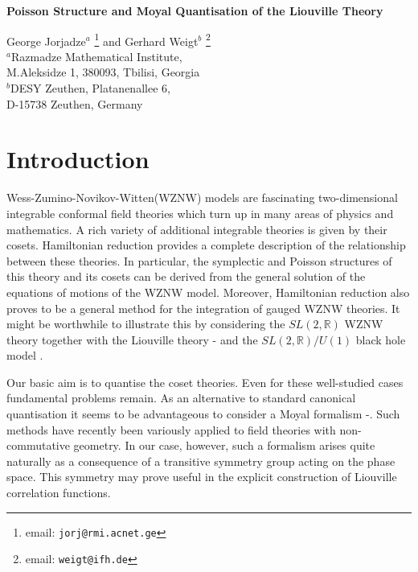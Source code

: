 \documentclass[a4paper,12pt]{article}
\renewcommand{\title}[1]{\begin{center}\bf\Large #1\end{center}}
\renewcommand{\author}[1]{\begin{center}\large #1\end{center}}
\newcommand{\rr}{\mathbb{R}}
\begin{document}
\title{Poisson Structure and Moyal Quantisation of the Liouville
 Theory }
\author{
 George Jorjadze${}^a$
\footnote{email: \tt jorj@rmi.acnet.ge}
 and Gerhard Weigt${}^b$
\footnote{email: \tt weigt@ifh.de} \\
{\small${}^a$Razmadze Mathematical Institute,}\\
  {\small M.Aleksidze 1, 380093, Tbilisi, Georgia}\\
{\small${}^b$DESY Zeuthen, Platanenallee 6,}\\
{\small D-15738 Zeuthen, Germany}}


\begin{abstract}
\noindent
The symplectic and Poisson structures of the Liouville theory are
derived from the symplectic form of the $SL(2,\rr)$ WZNW theory by
gauge invariant Hamiltonian reduction. Causal non-equal time Poisson
brackets for a Liouville field are presented.  Using the symmetries of
the Liouville theory, symbols of chiral fields are constructed and
their $*$-products calculated. Quantum deformations consistent with
the canonical quantisation result, and a non-equal time commutator
is given.
\end{abstract}

\baselineskip=20pt

\vspace{0.3cm}

\setcounter{equation}{0}
\section{Introduction}

\noindent
Wess-Zumino-Novikov-Witten(WZNW) models \cite{WZNW} are fascinating
two-dimensional integrable conformal field theories which turn
up in many areas of physics and mathematics. A rich variety of additional
integrable theories is given by their cosets.  Hamiltonian
reduction \cite{Balog, FJW} provides a complete description of the
relationship between these theories.
In particular, the symplectic and Poisson
structures of this theory \cite{Goddard, Gawedzki} and its cosets can
be derived from the general solution of the equations of motions
of the WZNW model.
Moreover,  Hamiltonian reduction also proves
to be a general method for the integration of gauged WZNW
theories. It might be worthwhile to illustrate this by considering
the $SL(2,\rr)$ WZNW theory together with the Liouville theory
\cite{Thorn}-\cite{OW} and the $SL(2,\rr)/U(1)$ black hole model
\cite{BCR, FJW}.

\noindent
Our basic aim is to quantise the coset theories.
Even for these well-studied cases fundamental problems remain.
As an alternative to standard  canonical quantisation
\cite{Thorn, Neveu, OW, FJW} it seems
to be advantageous to consider a Moyal formalism
\cite{Weyl}-\cite{Berezin}. Such methods have recently been
variously applied to field theories with non-commutative geometry.
In our case, however, such
a formalism arises quite naturally as a consequence of a transitive
symmetry group acting on the phase space.
This symmetry may prove useful in the explicit construction
of Liouville correlation functions.
\end{document}
